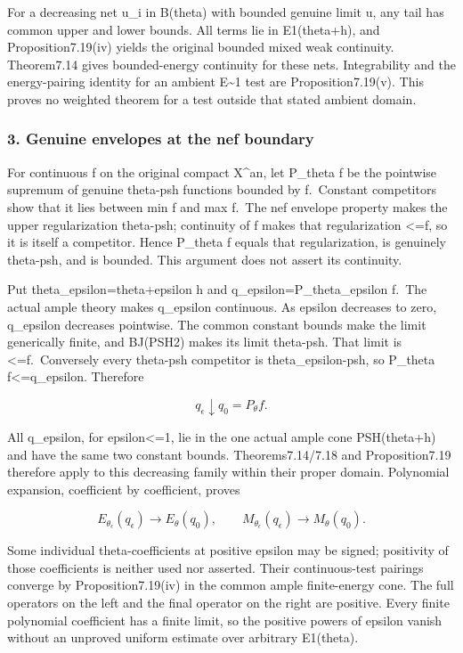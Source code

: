 \documentclass[
]{article}
\begin{document}
For a decreasing net u\_i in B(theta) with bounded genuine limit u, any
tail has common upper and lower bounds. All terms lie in E1(theta+h),
and Proposition7.19(iv) yields the original bounded mixed weak
continuity. Theorem7.14 gives bounded-energy continuity for these nets.
Integrability and the energy-pairing identity for an ambient
E\textasciitilde1 test are Proposition7.19(v). This proves no weighted
theorem for a test outside that stated ambient domain.

\subsubsection{3. Genuine envelopes at the nef
boundary}\label{genuine-envelopes-at-the-nef-boundary}

For continuous f on the original compact X\^{}an, let P\_theta f be the
pointwise supremum of genuine theta-psh functions bounded by f.~Constant
competitors show that it lies between min f and max f.~The nef envelope
property makes the upper regularization theta-psh; continuity of f makes
that regularization \textless=f, so it is itself a competitor. Hence
P\_theta f equals that regularization, is genuinely theta-psh, and is
bounded. This argument does not assert its continuity.

Put theta\_epsilon=theta+epsilon h and q\_epsilon=P\_theta\_epsilon
f.~The actual ample theory makes q\_epsilon continuous. As epsilon
decreases to zero, q\_epsilon decreases pointwise. The common constant
bounds make the limit generically finite, and BJ(PSH2) makes its limit
theta-psh. That limit is \textless=f.~Conversely every theta-psh
competitor is theta\_epsilon-psh, so P\_theta f\textless=q\_epsilon.
Therefore

\[q_\epsilon\downarrow q_0=P_\theta f.\]

All q\_epsilon, for epsilon\textless=1, lie in the one actual ample cone
PSH(theta+h) and have the same two constant bounds. Theorems7.14/7.18
and Proposition7.19 therefore apply to this decreasing family within
their proper domain. Polynomial expansion, coefficient by coefficient,
proves

\[E_{\theta_\epsilon}(q_\epsilon)\longrightarrow E_\theta(q_0),\qquad
M_{\theta_\epsilon}(q_\epsilon)\longrightarrow M_\theta(q_0).\]

Some individual theta-coefficients at positive epsilon may be signed;
positivity of those coefficients is neither used nor asserted. Their
continuous-test pairings converge by Proposition7.19(iv) in the common
ample finite-energy cone. The full operators on the left and the final
operator on the right are positive. Every finite polynomial coefficient
has a finite limit, so the positive powers of epsilon vanish without an
unproved uniform estimate over arbitrary E1(theta).
\end{document}

